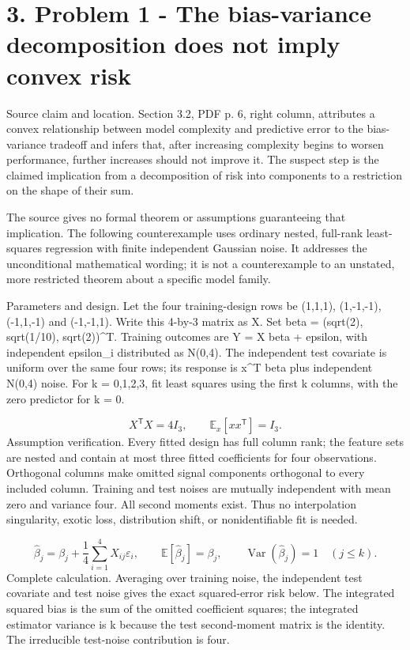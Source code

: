 \documentclass[10pt]{article}
\begin{document}
\section*{3. Problem 1 - The bias-variance decomposition does not imply convex risk}
Source claim and location. Section 3.2, PDF p. 6, right column, attributes a convex relationship between model complexity and predictive error to the bias-variance tradeoff and infers that, after increasing complexity begins to worsen performance, further increases should not improve it. The suspect step is the claimed implication from a decomposition of risk into components to a restriction on the shape of their sum.\par
The source gives no formal theorem or assumptions guaranteeing that implication. The following counterexample uses ordinary nested, full-rank least-squares regression with finite independent Gaussian noise. It addresses the unconditional mathematical wording; it is not a counterexample to an unstated, more restricted theorem about a specific model family.\par
Parameters and design. Let the four training-design rows be (1,1,1), (1,-1,-1), (-1,1,-1) and (-1,-1,1). Write this 4-by-3 matrix as X. Set beta = (sqrt(2), sqrt(1/10), sqrt(2))\textasciicircum{}T. Training outcomes are Y = X beta + epsilon, with independent epsilon\_i distributed as N(0,4). The independent test covariate is uniform over the same four rows; its response is x\textasciicircum{}T beta plus independent N(0,4) noise. For k = 0,1,2,3, fit least squares using the first k columns, with the zero predictor for k = 0.\par
\[X^{\mathsf T}X=4I_3,\qquad \mathbb E_x[xx^{\mathsf T}]=I_3.\] Assumption verification. Every fitted design has full column rank; the feature sets are nested and contain at most three fitted coefficients for four observations. Orthogonal columns make omitted signal components orthogonal to every included column. Training and test noises are mutually independent with mean zero and variance four. All second moments exist. Thus no interpolation singularity, exotic loss, distribution shift, or nonidentifiable fit is needed.\par
\[\widehat\beta_j=\beta_j+\frac14\sum_{i=1}^{4}X_{ij}\varepsilon_i,\qquad\mathbb E[\widehat\beta_j]=\beta_j,\qquad\operatorname{Var}(\widehat\beta_j)=1\quad (j\le k).\] Complete calculation. Averaging over training noise, the independent test covariate and test noise gives the exact squared-error risk below. The integrated squared bias is the sum of the omitted coefficient squares; the integrated estimator variance is k because the test second-moment matrix is the identity. The irreducible test-noise contribution is four.\par
\end{document}
